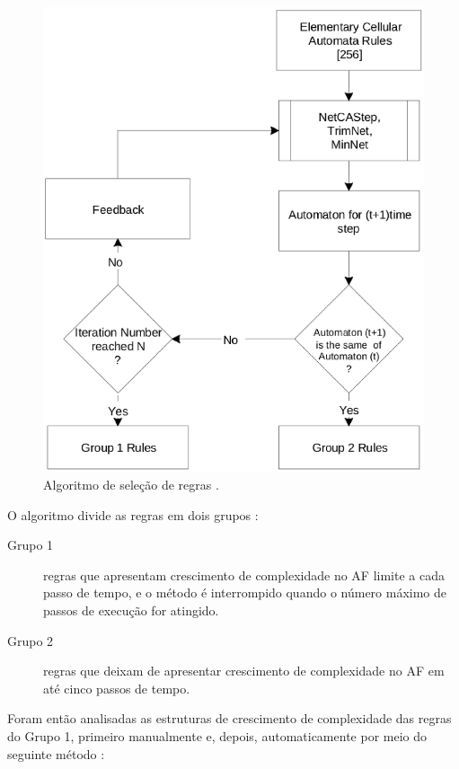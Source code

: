 \documentclass[12pt,a4paper]{article}
\begin{document}
\begin{figure}[htp]
\begin{center}
\includegraphics[scale=0.5]{img/rulesel.eps}
\caption{Algoritmo de seleção de regras .}
\label{fig:rulesel}
\end{center}
\end{figure}

O algoritmo divide as regras em dois grupos :

\begin{description}
\item[Grupo 1] regras que apresentam crescimento de complexidade no AF
limite a cada passo de tempo, e o método é interrompido quando o
número máximo de passos de execução for atingido.
\item[Grupo 2] regras que deixam de apresentar crescimento de complexidade no
AF em até cinco passos de tempo.
\end{description}

Foram então analisadas as estruturas de crescimento de complexidade das regras
do Grupo 1, primeiro manualmente e, depois, automaticamente por meio do
seguinte método :
\end{document}
